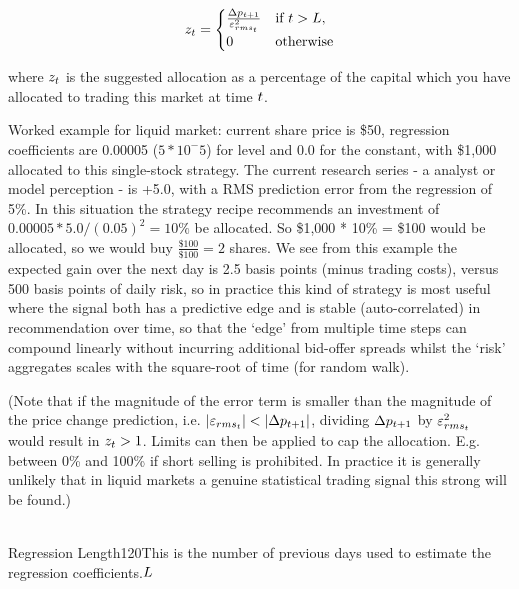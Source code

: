 \documentclass{article}%
\begin{document}
\vspace{1mm}
\begin{equation}
    z_t = 
    \begin{cases}
    \frac{\Delta p_{t+1}}{\varepsilon^{{2}}_{rms_{t}}} & \text{if } t > L,\\
    0                                        & \text{otherwise}
    \end{cases}
\end{equation}



\vspace{1mm}
\justify where $z_t$ is the suggested allocation as a percentage of the capital which you have allocated to trading this market at time $t$.

\justify Worked example for liquid market:  current share price is \$50, regression coefficients are 0.00005 ($5 * 10^-5$) for level and 0.0 for the constant, with \$1,000 allocated to this single-stock strategy.  The current research series - a analyst or model perception - is +5.0, with a RMS prediction error from the regression of 5\%. In this situation the strategy recipe recommends an investment of $0.00005 * 5.0 / (0.05)^2 = 10\%$ be allocated. So \$1,000 * 10\% = \$100 would be allocated, so we would buy $\frac{\$100}{\$100} = 2$ shares.
We see from this example the expected gain over the next day is 2.5 basis points (minus trading costs), versus 500 basis points of daily risk, so in practice this kind of strategy is most useful where the signal both has a predictive edge and is stable (auto-correlated) in recommendation over time, so that the `edge' from multiple time steps can compound linearly without incurring additional bid-offer spreads whilst the `risk' aggregates scales with the square-root of time (for random walk).


\vspace{1mm}
\justify (Note that if the magnitude of the error term is smaller than the magnitude of the price change prediction, i.e. $|\varepsilon_{rms_{t}}| < |\Delta p_{t+1}|$, dividing $\Delta p_{t+1}$ by $\varepsilon^{{2}}_{rms_{t}}$ would result in $z_t>1$. Limits can then be applied to cap the allocation. E.g. between 0\% and 100\% if short selling is prohibited. In practice it is generally unlikely that in liquid markets a genuine statistical trading signal this strong will be found.)

\\
\vspace{1mm}
{Regression Length}{120}{This is the number of previous days used to estimate the regression coefficients.}{$L$}%
\stoptable 
\end{document}
